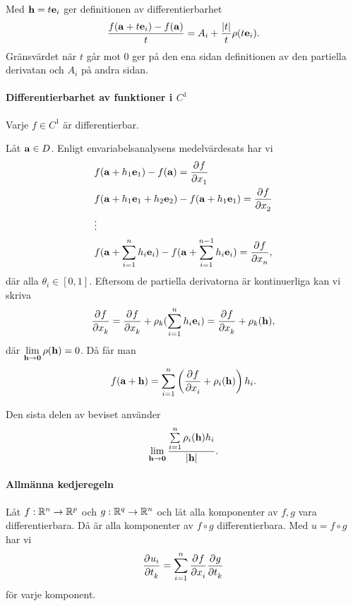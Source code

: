 \proof
Med $\vect{h} = t\vect{e}_i$ ger definitionen av differentierbarhet
\begin{align*}
	\frac{f(\vect{a} + t\vect{e}_i) - f(\vect{a})}{t} = A_i + \frac{\abs{t}}{t}\rho(t\vect{e}_i).
\end{align*}
Gränsvärdet när $t$ går mot $0$ ger på den ena sidan definitionen av den partiella derivatan och $A_i$ på andra sidan.

\paragraph{Differentierbarhet av funktioner i $C^1$}
Varje $f\in C^1$ är differentierbar.

\proof
Låt $\vect{a}\in D$. Enligt envariabelsanalysens medelvärdesats har vi
\begin{align*}
	&f(\vect{a} + h_1\vect{e}_1) - f(\vect{a}) = \pdeval{f}{x_1}{\vect{a} + \theta _1h_1\vect{e}_1} \\
	&f(\vect{a} + h_1\vect{e}_1 + h_2\vect{e}_2) - f(\vect{a} + h_1\vect{e}_1) = \pdeval{f}{x_2}{\vect{a} + h_1\vect{e}_1 + \theta_2h_2\vect{e}_2} \\
	&\vdots \\
	&f(\vect{a} + \sum\limits_{i = 1}^{n}h_i\vect{e}_i) - f(\vect{a} + \sum\limits_{i = 1}^{n - 1}h_i\vect{e}_i) = \pdeval{f}{x_n}{\vect{a} + \sum\limits_{i = 1}^{n - 1}h_i\vect{e}_i + \theta_nh_n\vect{e}_n},
\end{align*}
där alla $\theta_i\in [0, 1]$. Eftersom de partiella derivatorna är kontinuerliga kan vi skriva
\begin{align*}
	\pdeval{f}{x_k}{\vect{a} + \sum\limits_{i = 1}^{k - 1}h_i\vect{e}_i + \theta_kh_k\vect{e}_k} = \pdeval{f}{x_k}{\vect{a}} + \rho_k(\sum\limits_{i = 1}^{n}h_i\vect{e}_i) = \pdeval{f}{x_k}{\vect{a}} + \rho_k(\vect{h}),
\end{align*}
där $\limit{\vect{h}}{\vect{0}}\rho(\vect{h}) = 0$. Då får man
\begin{align*}
	f(\vect{a} + \vect{h}) = \sum\limits_{i = 1}^{n}\left(\pdeval{f}{x_i}{\vect{a}} + \rho_i(\vect{h})\right)h_i.
\end{align*}

Den sista delen av beviset använder
\begin{align*}
	\limit{\vect{h}}{\vect{0}}\frac{\sum\limits_{i = 1}^{n}\rho_i(\vect{h})h_i}{\abs{\vect{h}}}.
\end{align*}

\paragraph{Allmänna kedjeregeln}
Låt $f: \mathbb{R}^n\to\mathbb{R}^p$ och $g: \mathbb{R}^q\to\mathbb{R}^n$ och låt alla komponenter av $f, g$ vara differentierbara. Då är alla komponenter av $f\circ g$ differentierbara. Med $u = f\circ g$ har vi
\begin{align*}
	\pdeval{u_i}{t_k}{\vect{t}} = \sum\limits_{i = 1}^{n}\pdeval{f}{x_i}{g(\vect{t})}\pdeval{g}{t_k}{\vect{t}}
\end{align*}
för varje komponent.

